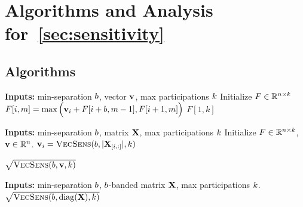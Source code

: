 \documentclass{article}
\begin{document}

\section{Algorithms and Analysis for~\cref{sec:sensitivity}}
\subsection{Algorithms}

\begin{algorithm}[H]
\caption{(\VecSens): Maximum of $\langle \bfv, \bfu\rangle$ where $\bfu$ is a vector in the $\ell_\infty$ unit ball satisfying $\Pi_\minsep$.}
\label{alg:minsepvectorsens}
\begin{algorithmic}%
\State \textbf{Inputs:} min-separation $\minsep$, vector $\mathbf{v}$, max participations $k$
\State Initialize $F \in \mathbb{R}^{n \times k}$
\State $F[i, m] = \max{\Big(\ensuremath{\mathbf{v}}_i + F[i+b, m-1], F[i+1, m]\Big)}$
\EndFor
\EndFor
\Return $F[1, k]$
\end{algorithmic}
\end{algorithm}

\begin{algorithm}[H]
\caption{Efficient sensitivity upper bound for \bparticipation} \label{alg:minsepsensgeneral}
\begin{algorithmic}%
\State \textbf{Inputs:} min-separation $\minsep$, matrix $\bfX$, max participations $k$
\State Initialize $F \in \mathbb{R}^{n \times k}$, $\mathbf{v} \in \mathbb{R}^n$.
\State $\mathbf{v}_i = \textsc{VecSens}(b, |\mathbf{X}_{[i, :]}|, k)$

\EndFor
\Return $\sqrt{\textsc{VecSens}(b, \mathbf{v}, k)}$
\end{algorithmic}
\end{algorithm}


\begin{algorithm}[H]
\caption{Efficient sensitivity calculation for \bparticipation, assuming $\bfX$ is $\minsep$-banded.} \label{alg:minsepsensbanded}
\begin{algorithmic}%
\State \textbf{Inputs:} min-separation $\minsep$, $\minsep$-banded matrix $\bfX$, max participations $k$.\\
\Return $\sqrt{\textsc{VecSens}(b, \operatorname{diag}(\mathbf{X}), k)}$
\end{algorithmic}
\end{algorithm}
\end{document}
